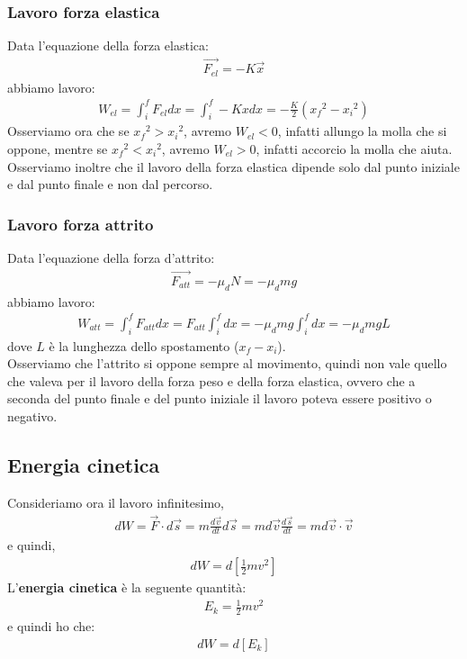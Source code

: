         \subsubsection{Lavoro forza elastica}
            Data l'equazione della forza elastica:
            \begin{align*}
                \vec{F_{el}}=-K\vec{x}
            \end{align*}
            abbiamo lavoro:
            \begin{align*}
                W_{el}=\int_i^f F_{el}dx=\int_i^f -Kxdx=-\frac{K}{2}({x_f}^2 - {x_i}^2)
            \end{align*}
            Osserviamo ora che se ${x_f}^2>{x_i}^2$, avremo $W_{el}<0$, infatti allungo la molla che si oppone, mentre se ${x_f}^2<{x_i}^2$, avremo $W_{el}>0$, infatti accorcio la molla che aiuta.\\
            Osserviamo inoltre che il lavoro della forza elastica dipende solo dal punto iniziale e dal punto finale e non dal percorso.

        \subsubsection{Lavoro forza attrito}
            Data l'equazione della forza d'attrito:
            \begin{align*}
                \vec{F_{att}}=-\mu_dN=-\mu_dmg
            \end{align*}
            abbiamo lavoro:
            \begin{align*}
                W_{att}=\int_i^f F_{att}dx=F_{att}\int_i^f dx=-\mu_dmg\int_i^f dx=-\mu_dmgL
            \end{align*}
            dove $L$ è la lunghezza dello spostamento ($x_f - x_i$).\\
            Osserviamo che l'attrito si oppone sempre al movimento, quindi non vale quello che valeva per il lavoro della forza peso e della forza elastica, ovvero che a seconda del punto finale e del punto iniziale il lavoro poteva essere positivo o negativo.

    \subsection{Energia cinetica}
        Consideriamo ora il lavoro infinitesimo,
        \begin{align*}
            dW=\vec{F}\cdot d\vec{s}= m\frac{d\vec{v}}{dt}d\vec{s}= md\vec{v} \frac{d\vec{s}}{dt}=md\vec{v}\cdot\vec{v}
        \end{align*}
        e quindi,
        \begin{align*}
            dW=d[\frac{1}{2}mv^2]
        \end{align*}
        L'\textbf{energia cinetica} è la seguente quantità:
        \begin{align*}
            E_k=\frac{1}{2}mv^2
        \end{align*}
        e quindi ho che:
        \begin{align*}
            dW=d[E_k]
        \end{align*}
